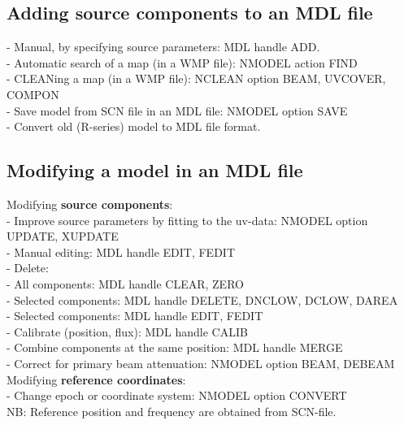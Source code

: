 \subsection{Adding source components to an MDL file} 
\label{mdl.generate} 

- Manual, by specifying source parameters: MDL handle ADD.\\ 
- Automatic search of a map (in a WMP file): NMODEL action FIND\\ 
- CLEANing a map (in a WMP file): NCLEAN option BEAM, UVCOVER, COMPON\\ 
- Save model from SCN file in an MDL file: NMODEL option SAVE\\ 
- Convert old (R-series) model to \NEWSTAR MDL file format.\\ 


\subsection{Modifying a model in an MDL file} 
\label{mdl.modify} 

Modifying {\bf source components}:\\ 
- Improve source parameters by fitting to the uv-data: 
		NMODEL option UPDATE, XUPDATE\\ 
- Manual editing: MDL handle EDIT, FEDIT\\ 
- Delete:\\ 
\hspace*{5mm} - All components: MDL handle CLEAR, ZERO\\ 
\hspace*{5mm} - Selected components: 
		MDL handle DELETE, DNCLOW, DCLOW, DAREA\\ 
\hspace*{5mm} - Selected components: MDL handle EDIT, FEDIT\\ 
- Calibrate (position, flux): MDL handle CALIB\\ 
- Combine components at the same position: MDL handle MERGE\\ 
- Correct for primary beam attenuation: NMODEL option BEAM, DEBEAM\\ 

Modifying {\bf reference coordinates}:\\ 
- Change epoch or coordinate system: NMODEL option CONVERT\\ 
NB: Reference position and frequency are obtained from SCN-file.\\ 

